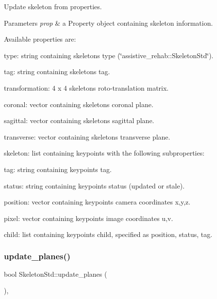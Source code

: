 Update skeleton from properties. 


\begin{DoxyParams}{Parameters}
{\em prop} & a Property object containing skeleton information.\\
\hline
\end{DoxyParams}
Available properties are\+:
\begin{DoxyItemize}
\item type\+: string containing skeleton\textquotesingle{}s type (\char`\"{}assistive\+\_\+rehab\+::\+Skeleton\+Std\char`\"{}).
\item tag\+: string containing skeleton\textquotesingle{}s tag.
\item transformation\+: 4 x 4 skeleton\textquotesingle{}s roto-\/translation matrix.
\item coronal\+: vector containing skeleton\textquotesingle{}s coronal plane.
\item sagittal\+: vector containing skeleton\textquotesingle{}s sagittal plane.
\item transverse\+: vector containing skeleton\textquotesingle{}s transverse plane.
\item skeleton\+: list containing keypoints with the following subproperties\+:
\begin{DoxyItemize}
\item tag\+: string containing keypoint\textquotesingle{}s tag.
\item status\+: string containing keypoint\textquotesingle{}s status (updated or stale).
\item position\+: vector containing keypoint\textquotesingle{}s camera coordinates x,y,z.
\item pixel\+: vector containing keypoint\textquotesingle{}s image coordinates u,v.
\item child\+: list containing keypoint\textquotesingle{}s child, specified as position, status, tag. 
\end{DoxyItemize}
\end{DoxyItemize}\mbox{\label{classassistive__rehab_1_1SkeletonStd_a5769bc6fd407118c866b57b869d672ca}} 
\subsubsection{\texorpdfstring{update\_planes()}{update\_planes()}}
{\footnotesize\ttfamily bool Skeleton\+Std\+::update\+\_\+planes (\begin{DoxyParamCaption}{ }\end{DoxyParamCaption})\hspace{0.3cm}{\ttfamily [override]}, {\ttfamily [virtual]}}



